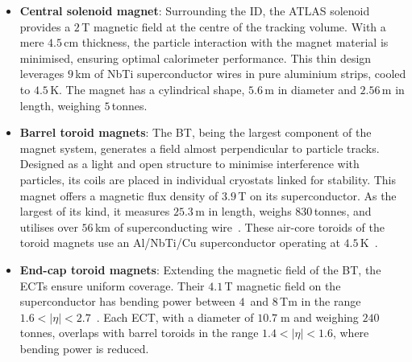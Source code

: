 \begin{itemize}
	\item \textbf{Central solenoid magnet}: Surrounding the ID, the ATLAS solenoid provides 
	a $2\,$T magnetic field at the centre of the tracking volume. With a mere $4.5\,$cm thickness, 
	the particle interaction with the magnet material is minimised, ensuring optimal calorimeter performance. 
	This thin design leverages $9\,$km of NbTi superconductor wires in pure aluminium strips, 
	cooled to $4.5\,$K. The magnet has a cylindrical shape, $5.6\,$m in diameter and $2.56\,$m 
	in length, weighing $5\,$tonnes.
	
	\item \textbf{Barrel toroid magnets}: The BT, being the largest component of the magnet system, 
	generates a field almost perpendicular to particle tracks. Designed as a light and open structure 
	to minimise interference with particles, its coils are placed in individual cryostats linked for stability.
	This magnet offers a magnetic flux density of $3.9\,$T on its superconductor. As the largest of its kind, 
	it measures $25.3\,$m in length, weighs 830$\,$tonnes, and utilises over $56\,$km of superconducting 
	wire~\cite{CERN-LHCC-97-018, ATLAS_Web_Detectors}.
	These air-core toroids of the toroid magnets use an Al/NbTi/Cu superconductor operating at 
	$4.5\,$K~\cite{CERN-LHCC-97-018}.

	\item \textbf{End-cap toroid magnets}: Extending the magnetic field of the BT, the ECTs ensure uniform 
	coverage. Their $4.1\,$T magnetic field on the superconductor has bending power between $4\,$ and 
	$8\,$Tm in the range $1.6 <|\eta| < 2.7$~\cite{CERN-LHCC-97-018}. Each ECT, with a diameter of $10.7\;$m 
	and weighing $240\,$tonnes, overlaps with barrel toroids in the range $1.4 <|\eta| <1.6$, where
	bending power is reduced.
\end{itemize}



